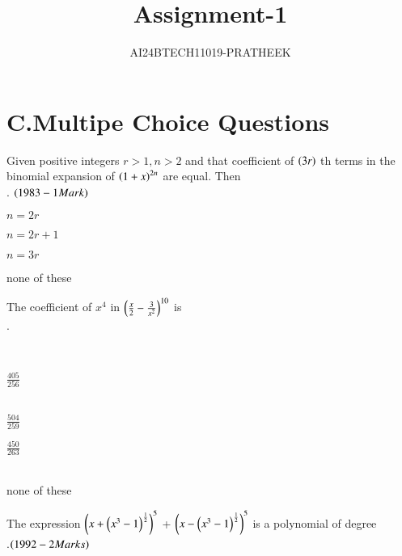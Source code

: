 \documentclass[journal,12pt,twocolumn]{IEEEtran}
\theoremstyle{remark}
\begin{document}

\vspace{3cm}

\title{Assignment-1}
\author{AI24BTECH11019-PRATHEEK}
\maketitle
\newpage
\bigskip

\renewcommand{\thefigure}{\theenumi}
\renewcommand{\thetable}{\theenumi}

\section*{\textbf{C.Multipe Choice Questions}}
\begin{enumerate}

\item   Given positive integers $r>1,n>2$ and that {coefficient} of $\left(3r\right)$ th terms in the binomial expansion of $\left(1+x\right)^{2n}$ are equal. Then\\.
$\hfill(1983-1Mark)$ \\
\begin{enumerate}[label =(\alph*)]
\begin{multicols}{2}
\item $n=2r$
\item $n=2r+1$
\item $n=3r$
\item none of these
\end{multicols}
\end{enumerate}
\item The coefficient of $x^4$ in $\left(\frac{x}{2}-\frac{3}{x^2}\right)^{10}$ is\\ .\hfill{\textit{}\\ 
\begin{enumerate}[label =(\alph*)]
\begin{multicols}{2}
\item $\frac{405}{256}$\\\\
\item $\frac{504}{259}$
    
\item $\frac{450}{263}$\\\\
\item none of these
\end{multicols}
\end{enumerate}
\item The expression $\left(x+\left(x^3-1\right)^{\frac{1}{2}}\right)^5$ + $\left(x-\left(x^3-1\right)^{\frac{1}{2}}\right)^5$ is a polynomial of degree \\
.\hfill{$\left(1992-2Marks\right)$}
\begin{enumerate}[label=(\alph*)]
\begin{multicols}{2}
    


\end{multicols}
\end{enumerate}}
\end{enumerate}
\end{document}
